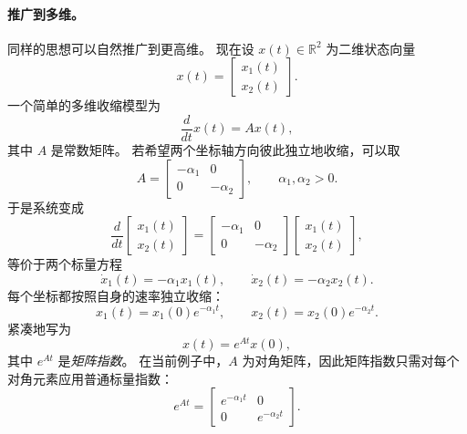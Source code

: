 \paragraph{推广到多维。}
同样的思想可以自然推广到更高维。
现在设 $x(t)\in\mathbb{R}^2$ 为二维状态向量
\[
x(t)=
\begin{bmatrix}
x_1(t)\\
x_2(t)
\end{bmatrix}.
\]
一个简单的多维收缩模型为
\[
\frac{d}{dt}x(t)=Ax(t),
\]
其中 $A$ 是常数矩阵。
若希望两个坐标轴方向彼此独立地收缩，可以取
\[
A=
\begin{bmatrix}
-\alpha_1 & 0\\
0 & -\alpha_2
\end{bmatrix},
\qquad \alpha_1,\alpha_2>0.
\]
于是系统变成
\[
\frac{d}{dt}
\begin{bmatrix}
x_1(t)\\
x_2(t)
\end{bmatrix}
=
\begin{bmatrix}
-\alpha_1 & 0\\
0 & -\alpha_2
\end{bmatrix}
\begin{bmatrix}
x_1(t)\\
x_2(t)
\end{bmatrix},
\]
等价于两个标量方程
\[
\dot{x}_1(t)=-\alpha_1x_1(t),
\qquad
\dot{x}_2(t)=-\alpha_2x_2(t).
\]
每个坐标都按照自身的速率独立收缩：
\[
x_1(t)=x_1(0)e^{-\alpha_1 t},
\qquad
x_2(t)=x_2(0)e^{-\alpha_2 t}.
\]
紧凑地写为
\[
x(t)=e^{At}x(0),
\]
其中 $e^{At}$ 是\emph{矩阵指数}。
在当前例子中，$A$ 为对角矩阵，因此矩阵指数只需对每个对角元素应用普通标量指数：
\[
e^{At}
=
\begin{bmatrix}
e^{-\alpha_1 t} & 0\\
0 & e^{-\alpha_2 t}
\end{bmatrix}.
\]

